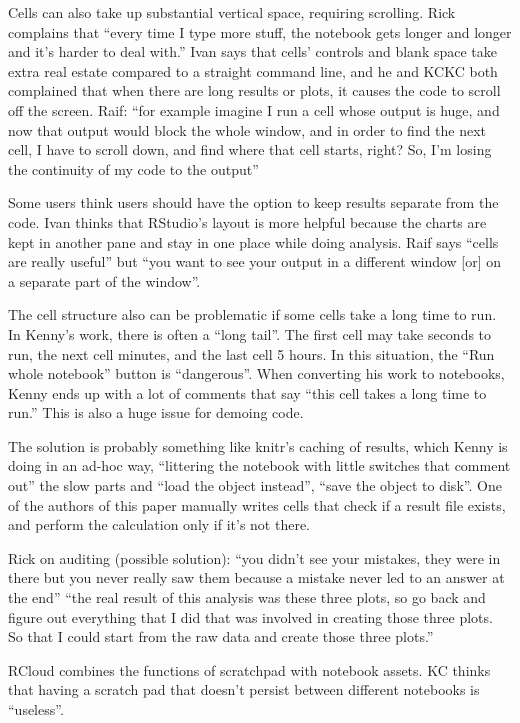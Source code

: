 Cells can also take up substantial vertical space, requiring scrolling. Rick
complains that ``every time I type more stuff, the notebook gets longer and
longer and it's harder to deal with.'' Ivan says that cells' controls and blank
space take extra real estate compared to a straight command line, and he and
KCKC both complained that when there are long results or plots, it causes the
code to scroll off the screen. Raif: ``for example imagine I run a cell whose
output is huge, and now that output would block the whole window, and in order
to find the next cell, I have to scroll down, and find where that cell starts,
right? So, I'm losing the continuity of my code to the output''

Some users think users should have the option to keep results separate from the
code.  Ivan thinks that RStudio's layout is more helpful because the charts
are kept in another pane and stay in one place while doing analysis. Raif says
``cells are really useful'' but ``you want to see your output in a different
window [or] on a separate part of the window''.

The cell structure also can be problematic if some cells take a long time to
run. In Kenny's work, there is often a ``long tail''.  The first cell may take
seconds to run, the next cell minutes, and the last cell 5 hours.  In this
situation, the ``Run whole notebook'' button is ``dangerous''. When converting
his work to notebooks, Kenny ends up with a lot of comments that say ``this cell
takes a long time to run.'' This is also a huge
issue for demoing code.

The solution is probably something like knitr's caching of results, which Kenny
is doing in an ad-hoc way, ``littering the notebook with little switches that
comment out'' the slow parts and ``load the object instead'', ``save the object
to disk''. One of the authors of this paper manually writes cells that check if
a result file exists, and perform the calculation only if it's not there.

Rick on auditing (possible solution): ``you didn't see your mistakes, they were
in there but you never really saw them because a mistake never led to an answer
at the end'' ``the real result of this analysis was these three plots, so go
back and figure out everything that I did that was involved in creating those
three plots. So that I could start from the raw data and create those three
plots.''

RCloud combines the functions of scratchpad with notebook assets. KC thinks
that having a scratch pad that doesn't persist between different notebooks is
``useless''.

